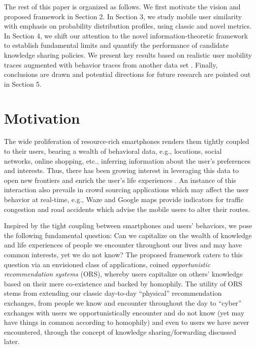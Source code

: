 \documentclass[12pt,epsf]{article}
\theoremstyle{definition}
\begin{document}
The rest of this paper is organized as follows. We first motivate the 
vision and proposed framework in Section 2. In Section 3, we study 
mobile user similarity with emphasis on probability distribution 
profiles, using classic and novel metrics. In Section 4, we 
shift our attention to the novel information-theoretic framework to establish 
fundamental limits and quantify the performance of candidate knowledge sharing 
policies.
We present key results based on realistic user mobility traces \cite{infocom,diot} 
augmented with behavior traces from another data set \cite{data}. Finally, conclusions are drawn and potential directions for future research are pointed out 
in Section 5.
\vspace{-0.5 cm}
\section{Motivation}
\vspace{-0.5 cm}
The wide proliferation of resource-rich smartphones renders them tightly coupled to their users, bearing a wealth of behavioral data, e.g., locations, social networks, online shopping, etc., inferring information about the user's preferences and interests. Thus, there has been growing interest in leveraging this data to open new frontiers and enrich the user's life experiences \cite{Eagle}. An instance of this interaction also prevails in crowd sourcing applications which may affect the user behavior at real-time, e.g., Waze and Google maps provide indicators for traffic congestion and road accidents which advise the mobile users to alter their routes.

Inspired by the tight coupling between smartphones and users' behaviors, we pose the following fundamental question: Can we capitalize on the wealth of knowledge and life experiences of people we encounter throughout our lives and may have common interests, yet we do not know? The proposed framework caters to this question via an envisioned class of applications, coined {\it opportunistic recommendation systems} (ORS), whereby users capitalize on others' knowledge based on their mere co-existence and backed by homophily. The utility of ORS stems from extending our classic day-to-day ``physical'' recommendation exchanges, from people we know and encounter throughout the day to ``cyber'' exchanges with users we opportunistically encounter and do not know (yet may have things in common according to homophily) and even to users we have never encountered, through the concept of knowledge sharing/forwarding discussed later.
\end{document}
